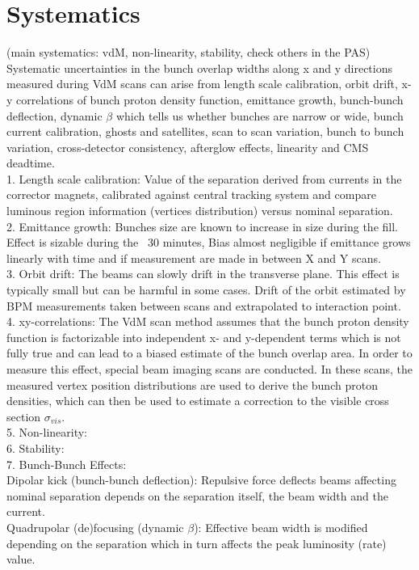 \section{Systematics}
\label{sec:syst}
(main systematics: vdM, non-linearity, stability, check others in the PAS) \\


Systematic uncertainties in the bunch overlap widths along x and y directions measured during VdM scans can arise from length scale calibration, orbit drift, x-y correlations of bunch proton density function, emittance growth, bunch-bunch deflection, dynamic $\beta$ which tells us whether bunches are narrow or wide, bunch current calibration, ghosts and satellites, scan to scan variation, bunch to bunch variation, cross-detector consistency, afterglow effects, linearity and CMS deadtime.  \\

1. Length scale calibration:  Value of the separation derived from currents in the corrector magnets, calibrated against central tracking system and compare luminous region information (vertices distribution) versus nominal separation. \\

2. Emittance growth: Bunches size are known to increase in size during the fill. Effect is sizable during the ~30 minutes, Bias almost negligible if emittance grows linearly with time and if measurement are made in between X and Y scans. \\

3. Orbit drift: The beams can slowly drift in the transverse plane. This effect is typically small but can be harmful in some cases. Drift of the orbit estimated by BPM measurements taken between scans and extrapolated to interaction point. \\

4. xy-correlations: The VdM scan method assumes that the bunch proton density function is factorizable into independent x- and y-dependent terms which is not fully true and can lead to a biased estimate of the bunch overlap area. In order to measure this effect, special beam imaging scans are conducted. In these scans, the measured vertex position distributions are used to derive the bunch proton densities, which can then be used to estimate a correction to the visible cross section $\sigma_{vis}$. \\

5. Non-linearity: \\

6. Stability:  \\

7. Bunch-Bunch Effects: \\

Dipolar kick (bunch-bunch deflection): Repulsive force deflects beams affecting nominal separation depends on the separation itself, the beam width and the current. \\
 
 Quadrupolar (de)focusing (dynamic $\beta$): Effective beam width is modified depending on the separation which in turn affects the peak luminosity (rate) value. \\

